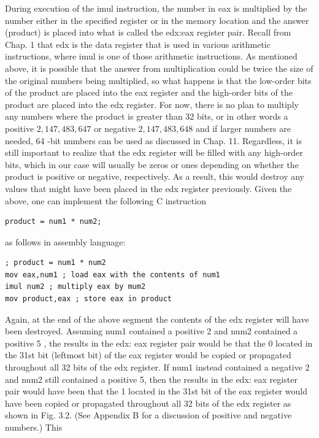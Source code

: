 \documentclass[10pt]{book}
\begin{document}
During execution of the imul instruction, the number in eax is multiplied by the number either in the specified register or in the memory location and the answer (product) is placed into what is called the edx:eax register pair. Recall from Chap. 1 that edx is the data register that is used in various arithmetic instructions, where imul is one of those arithmetic instructions. As mentioned above, it is possible that the answer from multiplication could be twice the size of the original numbers being multiplied, so what happens is that the low-order bits of the product are placed into the eax register and the high-order bits of the product are placed into the edx register. For now, there is no plan to multiply any numbers where the product is greater than 32 bits, or in other words a positive $2,147,483,647$ or negative $2,147,483,648$ and if larger numbers are needed, 64 -bit numbers can be used as discussed in Chap. 11. Regardless, it is still important to realize that the edx register will be filled with any high-order bits, which in our case will usually be zeros or ones depending on whether the product is positive or negative, respectively. As a result, this would destroy any values that might have been placed in the edx register previously. Given the above, one can implement the following C instruction


\begin{verbatim}
product = num1 * num2;
\end{verbatim}

as follows in assembly language:

\begin{verbatim}
; product = num1 * num2
mov eax,num1 ; load eax with the contents of num1
imul num2 ; multiply eax by mum2
mov product,eax ; store eax in product
\end{verbatim}

Again, at the end of the above segment the contents of the edx register will have been destroyed. Assuming num1 contained a positive 2 and num2 contained a positive 5 , the results in the edx: eax register pair would be that the 0 located in the 31st bit (leftmost bit) of the eax register would be copied or propagated throughout all 32 bits of the edx register. If num1 instead contained a negative 2 and num2 still contained a positive 5, then the results in the edx: eax register pair would have been that the 1 located in the 31st bit of the eax register would have been copied or propagated throughout all 32 bits of the edx register as shown in Fig. 3.2. (See Appendix B for a discussion of positive and negative numbers.) This
\end{document}
